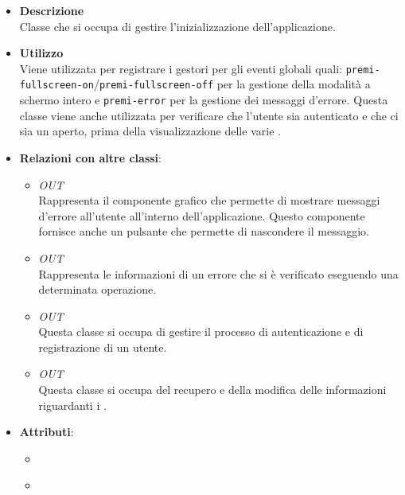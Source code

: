 \begin{itemize}
\item \textbf{Descrizione}\\
Classe che si occupa di gestire l'inizializzazione dell'applicazione.
\item \textbf{Utilizzo}\\
Viene utilizzata per registrare i gestori per gli eventi globali quali: \texttt{premi-fullscreen-on}/\texttt{premi-fullscreen-off} per la gestione della modalità a schermo intero e \texttt{premi-error} per la gestione dei messaggi d'errore.
Questa classe viene anche utilizzata per verificare che l'utente sia autenticato e che ci sia un  aperto, prima della visualizzazione delle varie .
\item \textbf{Relazioni con altre classi}:
\begin{itemize}
\item \textit{OUT} \hyperref[\nogloxy{Premi::Front-End::Directives::premiErrorMessage}]{}\\
Rappresenta il componente grafico che permette di mostrare messaggi d’errore all’utente all’interno dell’applicazione. Questo componente fornisce anche un pulsante che permette di nascondere il messaggio.
\item \textit{OUT} \hyperref[\nogloxy{Premi::Front-End::Model::ErrorInfo}]{}\\
Rappresenta le informazioni di un errore che si è verificato eseguendo una determinata operazione.
\item \textit{OUT} \hyperref[\nogloxy{Premi::Front-End::Services::AuthenticationService}]{}\\
Questa classe si occupa di gestire il processo di autenticazione e di registrazione di un utente.
\item \textit{OUT} \hyperref[\nogloxy{Premi::Front-End::Services::ProjectService}]{}\\
Questa classe si occupa del recupero e della modifica delle informazioni riguardanti i .
\end{itemize}
\item \textbf{Attributi}:
\begin{itemize}
\item {}
\\ \dpAuthenticationServiceField
\item {}

\end{itemize}
\end{itemize}
